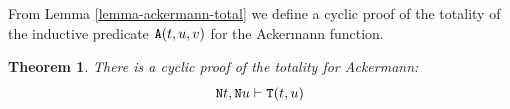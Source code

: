 \documentclass[a4paper,12pt]{article}
\newtheorem{theorem}{Theorem}[section]
\newcommand{\Nat}               { {\tt N}  }
\newcommand{\id}              { {\tt id} }
\newcommand{\eq}              { {\tt eq} }
\newcommand{\Tot}           { {\tt T} }
\newcommand{\Ack}   {{\tt A}}
\begin{document}

From Lemma \ref{lemma-ackermann-total} we define a cyclic proof of the totality of the 
inductive predicate $\Ack(t,u,v)$ for the Ackermann function.

\begin{theorem}
\label{theorem-ackermann-total}
There is a cyclic proof of the totality for Ackermann:
$$\Nat t, \Nat u \vdash \Tot(t,u)$$
\end{theorem}
\end{document}
